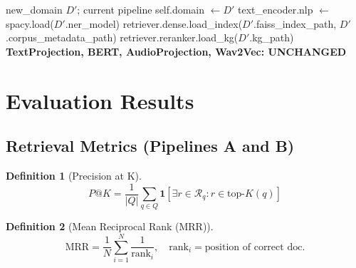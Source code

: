 \documentclass[12pt,a4paper]{article}
\theoremstyle{definition}
\newtheorem{definition}{Definition}[section]
\theoremstyle{plain}
\theoremstyle{remark}
\begin{document}
\begin{algorithm}[H]
\caption{Domain Hot-Swap (swap\_domain)}
\label{alg:swap}
\begin{algorithmic}[1]
\Require new\_domain $D'$; current pipeline
\State self.domain $\gets D'$
\State text\_encoder.nlp $\gets$ spacy.load($D'$.ner\_model)
\State retriever.dense.load\_index($D'$.faiss\_index\_path, $D'$.corpus\_metadata\_path)
\State retriever.reranker.load\_kg($D'$.kg\_path)
\State \textbf{TextProjection, BERT, AudioProjection, Wav2Vec: UNCHANGED}
\end{algorithmic}
\end{algorithm}

\newpage
\section{Evaluation Results}
\label{sec:eval}

\subsection{Retrieval Metrics (Pipelines A and B)}

\begin{definition}[Precision at K]
\[
  P@K = \frac{1}{|Q|}\sum_{q \in Q} \mathbf{1}\!\left[\exists r \in \mathcal{R}_q : r \in \text{top-}K(q)\right]
\]
\end{definition}

\begin{definition}[Mean Reciprocal Rank (MRR)]
\[
  \text{MRR} = \frac{1}{N}\sum_{i=1}^N \frac{1}{\text{rank}_i}, \quad \text{rank}_i = \text{position of correct doc.}
\]
\end{definition}
\end{document}
